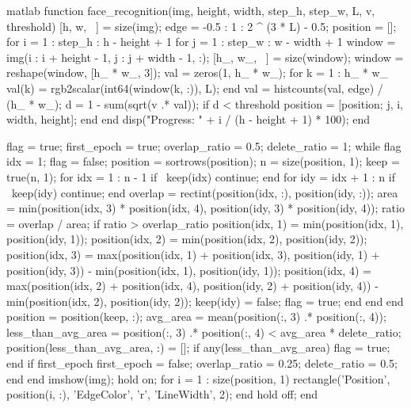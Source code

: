 \documentclass[a4paper]{article}  %
\begin{document}
\begin{codeblock}{matlab}
function face_recognition(img, height, width, step_h, step_w, L, v, threshold)
    [h, w, ~] = size(img);
    edge = -0.5 : 1 : 2 ^ (3 * L) - 0.5;
    position = [];
    for i = 1 : step_h : h - height + 1
        for j = 1 : step_w : w - width + 1
            window = img(i : i + height - 1, j : j + width - 1, :);
            [h_, w_, ~] = size(window);
            window = reshape(window, [h_ * w_, 3]);
            val = zeros(1, h_ * w_);
            for k = 1 : h_ * w_
                val(k) = rgb2scalar(int64(window(k, :)), L);
            end
            val = histcounts(val, edge) / (h_ * w_);
            d = 1 - sum(sqrt(v .* val));
            if d < threshold
                position = [position; j, i, width, height];
            end
        end
        disp("Progress: " + i / (h - height + 1) * 100);
    end
    
    flag = true;
    first_epoch = true;
    overlap_ratio = 0.5;
    delete_ratio = 1;
    while flag
        idx = 1;
        flag = false;
        position = sortrows(position);
        n = size(position, 1);
        keep = true(n, 1);
        for idx = 1 : n - 1
            if ~keep(idx)
                continue;
            end
            for idy = idx + 1 : n
                if ~keep(idy)
                    continue;
                end
                overlap = rectint(position(idx, :), position(idy, :));
                area = min(position(idx, 3) * position(idx, 4), position(idy, 3) * position(idy, 4));
                ratio = overlap / area;
                if ratio > overlap_ratio
                    position(idx, 1) = min(position(idx, 1), position(idy, 1));
                    position(idx, 2) = min(position(idx, 2), position(idy, 2));
                    position(idx, 3) = max(position(idx, 1) + position(idx, 3), position(idy, 1) + position(idy, 3)) - min(position(idx, 1), position(idy, 1));
                    position(idx, 4) = max(position(idx, 2) + position(idx, 4), position(idy, 2) + position(idy, 4)) - min(position(idx, 2), position(idy, 2));
                    keep(idy) = false;
                    flag = true;
                end
            end
        end
        position = position(keep, :);
        avg_area = mean(position(:, 3) .* position(:, 4));
        less_than_avg_area = position(:, 3) .* position(:, 4) < avg_area * delete_ratio;
        position(less_than_avg_area, :) = [];
        if any(less_than_avg_area)
            flag = true;
        end
        if first_epoch
            first_epoch = false;
            overlap_ratio = 0.25;
            delete_ratio = 0.5;
        end
    end
    imshow(img);
    hold on;
    for i = 1 : size(position, 1)
        rectangle('Position', position(i, :), 'EdgeColor', 'r', 'LineWidth', 2);
    end
    hold off;
end
\end{codeblock}
\end{document}
